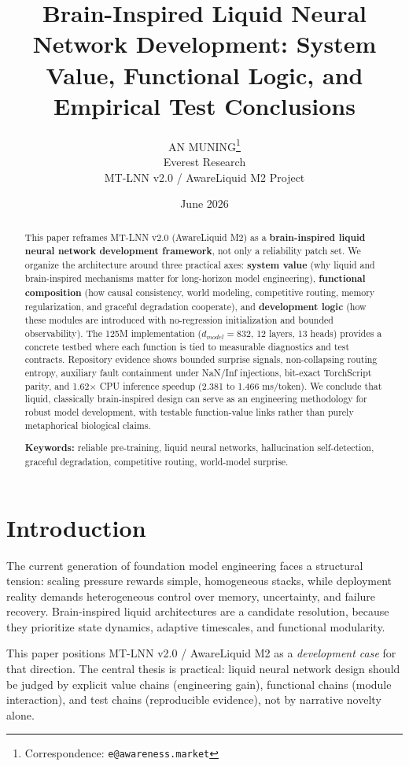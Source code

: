 \documentclass[10pt,twocolumn]{article}
\title{Brain-Inspired Liquid Neural Network Development: System Value, Functional Logic, and Empirical Test Conclusions}
\author{
  AN MUNING\thanks{Correspondence: \texttt{e@awareness.market}} \\
  Everest Research \\
  MT-LNN v2.0 / AwareLiquid M2 Project
}
\date{June 2026}
\begin{document}
\maketitle
\sloppy
\setlength{\emergencystretch}{3em}
\setlength{\textfloatsep}{8pt plus 2pt minus 2pt}
\setlength{\floatsep}{6pt plus 2pt minus 2pt}

\begin{abstract}
This paper reframes MT-LNN v2.0 (AwareLiquid M2) as a \textbf{brain-inspired liquid neural network development framework}, not only a reliability patch set. We organize the architecture around three practical axes: \textbf{system value} (why liquid and brain-inspired mechanisms matter for long-horizon model engineering), \textbf{functional composition} (how causal consistency, world modeling, competitive routing, memory regularization, and graceful degradation cooperate), and \textbf{development logic} (how these modules are introduced with no-regression initialization and bounded observability). The 125M implementation ($d_{model}=832$, 12 layers, 13 heads) provides a concrete testbed where each function is tied to measurable diagnostics and test contracts. Repository evidence shows bounded surprise signals, non-collapsing routing entropy, auxiliary fault containment under NaN/Inf injections, bit-exact TorchScript parity, and 1.62$\times$ CPU inference speedup (2.381 to 1.466 ms/token). We conclude that liquid, classically brain-inspired design can serve as an engineering methodology for robust model development, with testable function-value links rather than purely metaphorical biological claims.
\par\smallskip
\noindent\textbf{Keywords:} reliable pre-training, liquid neural networks, hallucination self-detection, graceful degradation, competitive routing, world-model surprise.
\end{abstract}

\section{Introduction}
The current generation of foundation model engineering faces a structural tension: scaling pressure rewards simple, homogeneous stacks, while deployment reality demands heterogeneous control over memory, uncertainty, and failure recovery. Brain-inspired liquid architectures are a candidate resolution, because they prioritize state dynamics, adaptive timescales, and functional modularity.

This paper positions MT-LNN v2.0 / AwareLiquid M2 as a \emph{development case} for that direction. The central thesis is practical: liquid neural network design should be judged by explicit value chains (engineering gain), functional chains (module interaction), and test chains (reproducible evidence), not by narrative novelty alone.
\end{document}
